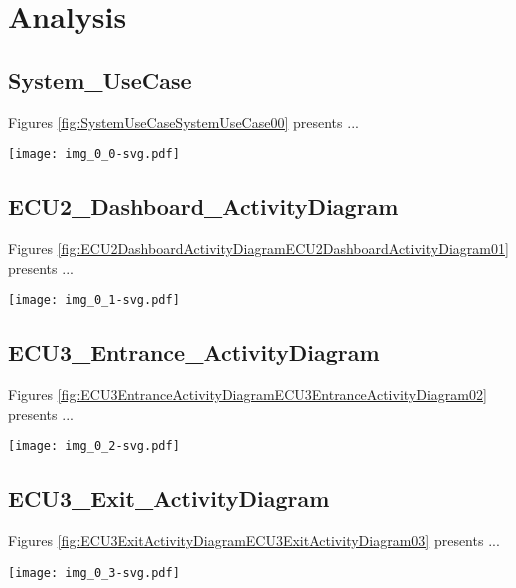 
\section{Analysis}
\subsection{System\_UseCase}
Figures \ref{fig:SystemUseCaseSystemUseCase00} presents ...
\begin{figure*}[htb]
\centering
\texttt{[image: img\_0\_0-svg.pdf]}
\caption{Diagram "System\_UseCase"}
\label{fig:SystemUseCaseSystemUseCase00}
\end{figure*}

\subsection{ECU2\_Dashboard\_ActivityDiagram}
Figures \ref{fig:ECU2DashboardActivityDiagramECU2DashboardActivityDiagram01} presents ...
\begin{figure*}[htb]
\centering
\texttt{[image: img\_0\_1-svg.pdf]}
\caption{Diagram "ECU2\_Dashboard\_ActivityDiagram"}
\label{fig:ECU2DashboardActivityDiagramECU2DashboardActivityDiagram01}
\end{figure*}

\subsection{ECU3\_Entrance\_ActivityDiagram}
Figures \ref{fig:ECU3EntranceActivityDiagramECU3EntranceActivityDiagram02} presents ...
\begin{figure*}[htb]
\centering
\texttt{[image: img\_0\_2-svg.pdf]}
\caption{Diagram "ECU3\_Entrance\_ActivityDiagram"}
\label{fig:ECU3EntranceActivityDiagramECU3EntranceActivityDiagram02}
\end{figure*}

\subsection{ECU3\_Exit\_ActivityDiagram}
Figures \ref{fig:ECU3ExitActivityDiagramECU3ExitActivityDiagram03} presents ...
\begin{figure*}[htb]
\centering
\texttt{[image: img\_0\_3-svg.pdf]}
\caption{Diagram "ECU3\_Exit\_ActivityDiagram"}
\label{fig:ECU3ExitActivityDiagramECU3ExitActivityDiagram03}
\end{figure*}

